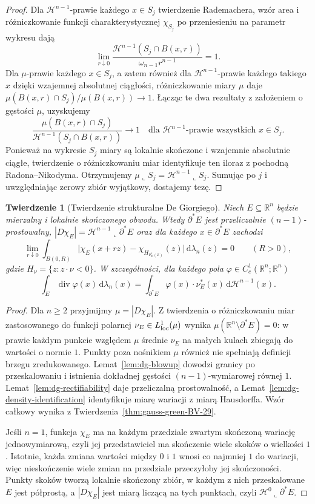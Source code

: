\documentclass[11pt,a4paper,oneside]{book}
\numberwithin{equation}{chapter}
\theoremstyle{plain}
\newtheorem{twierdzenie}{Twierdzenie}[chapter]
\theoremstyle{definition}
\theoremstyle{remark}
\begin{document}
\begin{proof}
Dla $\mathcal H^{n-1}$-prawie każdego $x\in S_j$
twierdzenie Rademachera, wzór area i
różniczkowanie funkcji charakterystycznej
$\chi_{S_j}$ po przeniesieniu na parametr
wykresu dają
\[
 \lim_{r\downarrow0}
 \frac{\mathcal H^{n-1}(S_j\cap B(x,r))}
 {\omega_{n-1}r^{n-1}}=1.
\]
Dla $\mu$-prawie każdego $x\in S_j$,
a zatem również dla $\mathcal H^{n-1}$-prawie
każdego takiego $x$ dzięki wzajemnej
absolutnej ciągłości, różniczkowanie miary
$\mu$ daje
$\mu(B(x,r)\cap S_j)/\mu(B(x,r))\to1$.
Łącząc te dwa rezultaty z założeniem o gęstości
$\mu$, uzyskujemy
\[
 \frac{\mu(B(x,r)\cap S_j)}
 {\mathcal H^{n-1}(S_j\cap B(x,r))}
 \longrightarrow1
 \quad\text{dla }\mathcal H^{n-1}\text{-prawie wszystkich }x\in S_j.
\]
Ponieważ na wykresie $S_j$ miary są lokalnie
skończone i wzajemnie absolutnie ciągłe,
twierdzenie o różniczkowaniu miar identyfikuje
ten iloraz z pochodną Radona--Nikodyma.
Otrzymujemy $\mu\llcorner S_j=
\mathcal H^{n-1}\llcorner S_j$.
Sumując po $j$ i uwzględniając zerowy zbiór
wyjątkowy, dostajemy tezę.
\end{proof}

\begin{twierdzenie}[Twierdzenie strukturalne De Giorgiego]
\label{thm:de-giorgi-structure-29}
Niech $E\subseteq\mathbb R^n$ będzie mierzalny
i lokalnie skończonego obwodu. Wtedy
$\partial^*E$ jest przeliczalnie $(n-1)$-prostowalny,
$|D\chi_E|=\mathcal H^{n-1}\llcorner\partial^*E$
oraz dla każdego $x\in\partial^*E$ zachodzi
\[
 \lim_{r\downarrow0}\int_{B(0,R)}
 \bigl|\chi_E(x+rz)-\chi_{H_{\nu_E^*(x)}}(z)\bigr|
 \,\mathrm d\lambda_n(z)=0\qquad(R>0),
\]
gdzie $H_\nu=\{z:z\cdot\nu<0\}$.
W szczególności, dla każdego pola
$\varphi\in C_c^1(\mathbb R^n;\mathbb R^n)$
\[
 \int_E\operatorname{div}\varphi(x)\,\mathrm d\lambda_n(x)
 =\int_{\partial^*E}\varphi(x)\cdot\nu_E^*(x)
 \,\mathrm d\mathcal H^{n-1}(x).
\]
\end{twierdzenie}
\begin{proof}
Dla $n\ge2$ przyjmijmy $\mu=|D\chi_E|$.
Z twierdzenia o różniczkowaniu miar zastosowanego
do funkcji polarnej $\nu_E\in L^1_{\rm loc}(\mu)$
wynika
$\mu(\mathbb R^n\setminus\partial^*E)=0$:
w prawie każdym punkcie względem $\mu$
średnie $\nu_E$ na małych kulach zbiegają do
wartości o normie $1$. Punkty poza nośnikiem
$\mu$ również nie spełniają definicji
brzegu zredukowanego.
Lemat~\ref{lem:dg-blowup} dowodzi granicy
po przeskalowaniu i istnienia dokładnej
gęstości $(n-1)$-wymiarowej równej $1$.
Lemat~\ref{lem:dg-rectifiability} daje
przeliczalną prostowalność, a
Lemat~\ref{lem:dg-density-identification}
identyfikuje miarę wariacji z miarą Hausdorffa.
Wzór całkowy wynika z
Twierdzenia~\ref{thm:gauss-green-BV-29}.

Jeśli $n=1$, funkcja $\chi_E$ ma na każdym
przedziale zwartym skończoną wariację
jednowymiarową, czyli jej przedstawiciel
ma skończenie wiele skoków o wielkości $1$.
Istotnie, każda zmiana wartości między
$0$ i $1$ wnosi co najmniej $1$ do wariacji,
więc nieskończenie wiele zmian na przedziale
przeczyłoby jej skończoności. Punkty skoków
tworzą lokalnie skończony zbiór, w każdym z nich
przeskalowane $E$ jest półprostą, a
$|D\chi_E|$ jest miarą liczącą na tych punktach,
czyli $\mathcal H^0\llcorner\partial^*E$.
\end{proof}
\end{document}
